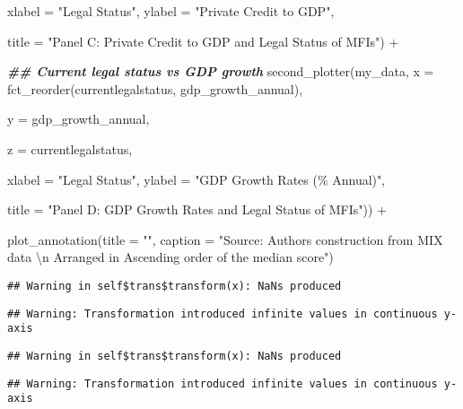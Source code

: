 \documentclass[a4paper,nobind]{templates/ociamthesis}
\newenvironment{Shaded}{\begin{snugshade}}{\end{snugshade}}
\newcommand{\AttributeTok}[1]{\textcolor[rgb]{0.77,0.63,0.00}{#1}}
\newcommand{\DocumentationTok}[1]{\textcolor[rgb]{0.56,0.35,0.01}{\textbf{\textit{#1}}}}
\newcommand{\FunctionTok}[1]{\textcolor[rgb]{0.00,0.00,0.00}{#1}}
\newcommand{\NormalTok}[1]{#1}
\newcommand{\SpecialCharTok}[1]{\textcolor[rgb]{0.00,0.00,0.00}{#1}}
\newcommand{\StringTok}[1]{\textcolor[rgb]{0.31,0.60,0.02}{#1}}
\renewenvironment{Shaded}
{
  \vspace{10pt}%
  \begin{snugshade}%
}{%
  \end{snugshade}%
  \vspace{8pt}%
}
\begin{document}
\begin{Shaded}
\begin{Highlighting}[]
               \AttributeTok{xlabel =} \StringTok{"Legal Status"}\NormalTok{, }\AttributeTok{ylabel =} \StringTok{"Private Credit to GDP"}\NormalTok{, }
               
               \AttributeTok{title =} \StringTok{"Panel C: Private Credit to GDP and Legal Status of MFIs"}\NormalTok{) }\SpecialCharTok{+}


\DocumentationTok{\#\# Current legal status vs GDP growth }
\FunctionTok{second\_plotter}\NormalTok{(my\_data, }\AttributeTok{x =} \FunctionTok{fct\_reorder}\NormalTok{(currentlegalstatus, gdp\_growth\_annual), }
               
               \AttributeTok{y =}\NormalTok{ gdp\_growth\_annual, }
               
               \AttributeTok{z =}\NormalTok{ currentlegalstatus, }
               
               \AttributeTok{xlabel =} \StringTok{"Legal Status"}\NormalTok{, }\AttributeTok{ylabel =} \StringTok{"GDP Growth Rates (\% Annual)"}\NormalTok{, }
               
               \AttributeTok{title =} \StringTok{"Panel D: GDP Growth Rates and Legal Status of MFIs"}\NormalTok{)) }\SpecialCharTok{+}


\FunctionTok{plot\_annotation}\NormalTok{(}\AttributeTok{title =} \StringTok{""}\NormalTok{, }\AttributeTok{caption =} \StringTok{"Source: Authors\textquotesingle{} construction from MIX data }\SpecialCharTok{\textbackslash{}n}
\StringTok{                Arranged in Ascending order of the median score"}\NormalTok{)}
\end{Highlighting}
\end{Shaded}

\begin{verbatim}
## Warning in self$trans$transform(x): NaNs produced
\end{verbatim}

\begin{verbatim}
## Warning: Transformation introduced infinite values in continuous y-axis
\end{verbatim}

\begin{verbatim}
## Warning in self$trans$transform(x): NaNs produced
\end{verbatim}

\begin{verbatim}
## Warning: Transformation introduced infinite values in continuous y-axis
\end{verbatim}
\end{document}
